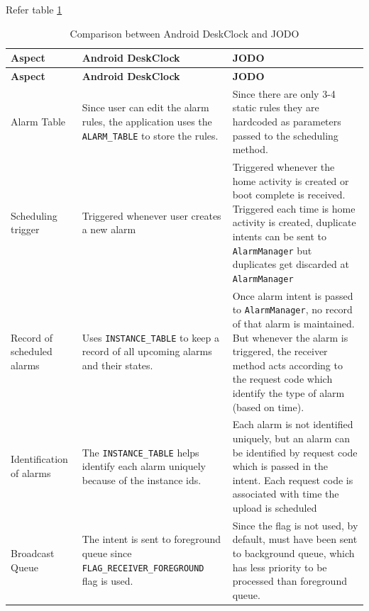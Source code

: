 \documentclass{article}
\begin{document}
Refer table \ref{tab:deskclock_comparison}

\begin{longtable}{|p{3cm}|p{5.5cm}|p{5.5cm}|}
\caption{Comparison between Android DeskClock and JODO} 
\label{tab:deskclock_comparison} \\

\hline
\textbf{Aspect} & \textbf{Android DeskClock} & \textbf{JODO} \\
\hline
\endfirsthead

\hline
\textbf{Aspect} & \textbf{Android DeskClock} & \textbf{JODO} \\
\hline
\endhead

\hline
\endfoot

\hline
\endlastfoot

Alarm Table & 
Since user can edit the alarm rules, the application uses the \texttt{ALARM\_TABLE} to store the rules. &
Since there are only 3-4 static rules they are hardcoded as parameters passed to the scheduling method. \\
\hline

Scheduling trigger & 
Triggered whenever user creates a new alarm  &
Triggered whenever the home activity is created or boot complete is received. Triggered each time is home activity is created, duplicate intents can be sent to \texttt{AlarmManager} but duplicates get discarded at \texttt{AlarmManager} \\
\hline

Record of scheduled alarms & 
Uses \texttt{INSTANCE\_TABLE} to keep a record of all upcoming alarms and their states. &
Once alarm intent is passed to \texttt{AlarmManager}, no record of that alarm is maintained. But whenever the alarm is triggered, the receiver method acts according to the request code which identify the type of alarm (based on time). \\
\hline

Identification of alarms & 
The \texttt{INSTANCE\_TABLE} helps identify each alarm uniquely because of the instance ids. & 
Each alarm is not identified uniquely, but an alarm can be identified by request code which is passed in the intent. Each request code is associated with time the upload is scheduled \\
\hline

Broadcast Queue & 
The intent is sent to foreground queue since \texttt{FLAG\_RECEIVER\_FOREGROUND} flag is used. & 
Since the flag is not used, by default, must have been sent to background queue, which has less priority to be processed than foreground queue. \\
\hline


\end{longtable}
\end{document}

